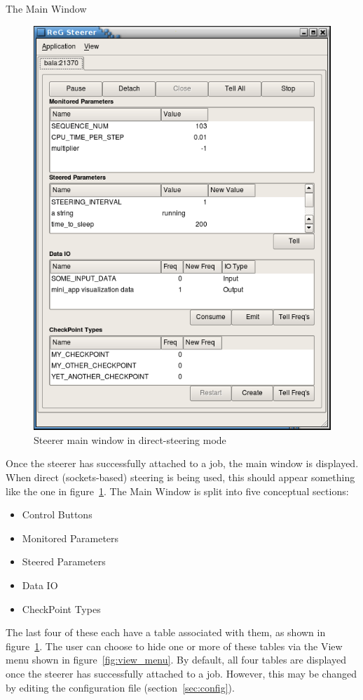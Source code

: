 \documentclass[a4paper,twoside]{article}
\begin{document}
\begin{section}{The Main Window}
\label{sec:main_win}

\begin{figure}
\centerline{\includegraphics{main_sockets.png}}
\caption{Steerer main window in direct-steering mode}
\label{fig:main_socks}
\end{figure}

Once the steerer has successfully attached to a job, the main window
is displayed.  When direct (sockets-based) steering is being used, this
should appear something like the one in figure~\ref{fig:main_socks}.
The Main Window is split into five conceptual sections:
\begin{itemize}
\item Control Buttons
\item Monitored Parameters
\item Steered Parameters
\item Data IO
\item CheckPoint Types
\end{itemize}
The last four of these each have a table associated with them, as
shown in figure~\ref{fig:main_socks}.  The user can choose to hide one
or more of these tables via the View menu shown in
figure~\ref{fig:view_menu}.  By default, all four tables are displayed
once the steerer has successfully attached to a job.  However, this
may be changed by editing the configuration file
(section~\ref{sec:config}).


\end{section}
\end{document}
